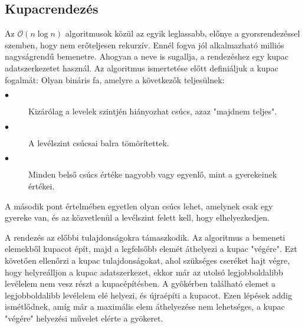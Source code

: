 \documentclass{elteikthesis}
\begin{document}
\subsection{Kupacrendezés}
Az $\mathcal{O}(n\log n)$ algoritmusok közül az egyik leglassabb, előnye a gyorsrendezéssel szemben, hogy nem erőteljesen rekurzív. Ennél fogva jól alkalmazható milliós nagyságrendű bemenetre. Ahogyan a neve is sugallja, a rendezéshez egy kupac adatszerkezetet használ. Az algoritmus ismertetése előtt definiáljuk a kupac fogalmát\cite{Fekete}:
Olyan bináris fa, amelyre a következők teljesülnek:
\begin{description}
	\item[$\bullet$] Kizárólag a levelek szintjén hiányozhat csúcs, azaz "majdnem teljes".
	\item[$\bullet$] A levélszint csúcsai balra tömörítettek.
	\item[$\bullet$] Minden belső csúcs értéke nagyobb vagy egyenlő, mint a gyerekeinek értékei.
\end{description}
A második pont értelmében egyetlen olyan csúcs lehet, amelynek csak egy gyereke van, és az közvetlenül a levélszint felett kell, hogy elhelyezkedjen.\par
A rendezés az előbbi tulajdonságokra támaszkodik. 
Az algoritmus a bemeneti elemekből kupacot épít, majd a legfelsőbb elemét áthelyezi a kupac "végére". Ezt követően ellenőrzi a kupac tulajdonságokat, ahol szükséges cseréket hajt végre, hogy helyreálljon a kupac adatszerkezet, ekkor már az utolsó legjobboldalibb levélelem nem vesz részt a kupacépítésben. A gyökérben található elemet a legjobboldalibb levélelem elé helyezi, és újraépíti a kupacot. Ezen lépések addig ismétlődnek, amíg már a maximális elem áthelyezése nem lehetséges, a kupac "végére" helyezési művelet elérte a gyökeret.\par
\end{document}
